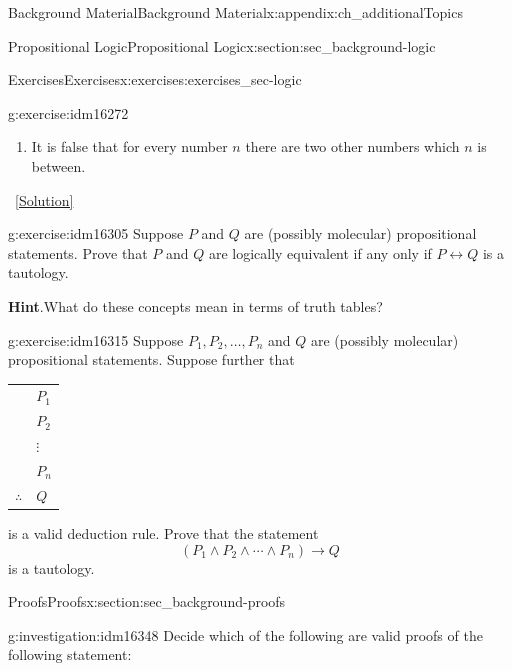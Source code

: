 \documentclass[oneside,10pt,]{book}
\numberwithin{equation}{chapter}
\newcommand{\hrulethin}  {\noalign{\hrule height 0.04em}}
\def\iff{\leftrightarrow}
\def\imp{\rightarrow}
\begin{document}
\begin{appendixptx}{Background Material}{}{Background Material}{}{}{x:appendix:ch_additionalTopics}
\begin{sectionptx}{Propositional Logic}{}{Propositional Logic}{}{}{x:section:sec_background-logic}
\begin{exercises-subsection}{Exercises}{}{Exercises}{}{}{x:exercises:exercises_sec-logic}
\begin{divisionexercise}{14}{}{}{g:exercise:idm16272}
\begin{enumerate}[label=(\alph*)]
\item{}It is false that for every number \(n\) there are two other numbers which \(n\) is between.%
\end{enumerate}
%
\qquad~\hfill{\tiny\hyperlink{g:solution:idm16291-main}{[Solution]}}\end{divisionexercise}%
\begin{divisionexercise}{15}{}{}{g:exercise:idm16305}%
Suppose \(P\) and \(Q\) are (possibly molecular) propositional statements.  Prove that \(P\) and \(Q\) are logically equivalent if any only if \(P \iff Q\) is a tautology.%
\par\smallskip%
\noindent\textbf{Hint}.\hypertarget{g:hint:idm16313}{}\quad{}What do these concepts mean in terms of truth tables?%
\end{divisionexercise}%
\begin{divisionexercise}{16}{}{}{g:exercise:idm16315}%
Suppose \(P_1, P_2, \ldots, P_n\) and \(Q\) are (possibly molecular) propositional statements.  Suppose further that%
\begin{sidebyside}{1}{0}{0}{0}%
\begin{sbspanel}{1}%
{\centering%
\begin{tabular}{ll}
&\(P_1\)\tabularnewline[0pt]
&\(P_2\)\tabularnewline[0pt]
&\(\vdots\)\tabularnewline[0pt]
&\(P_n\)\tabularnewline\hrulethin
\(\therefore\)&\(Q\)
\end{tabular}
\par}
\end{sbspanel}%
\end{sidebyside}%
\par
is a valid deduction rule.  Prove that the statement%
\begin{equation*}
(P_1 \wedge P_2 \wedge \cdots \wedge P_n) \imp Q
\end{equation*}
is a tautology.%
\end{divisionexercise}%
\end{exercises-subsection}
\end{sectionptx}
%
%
\typeout{************************************************}
\typeout{************************************************}
%
\begin{sectionptx}{Proofs}{}{Proofs}{}{}{x:section:sec_background-proofs}
\begin{introduction}{}%
\begin{investigation}{}{g:investigation:idm16348}%
Decide which of the following are valid proofs of the following statement:%
\begin{quote}%

\end{quote}
\end{investigation}
\end{introduction}
\end{sectionptx}
\end{appendixptx}
\end{document}
